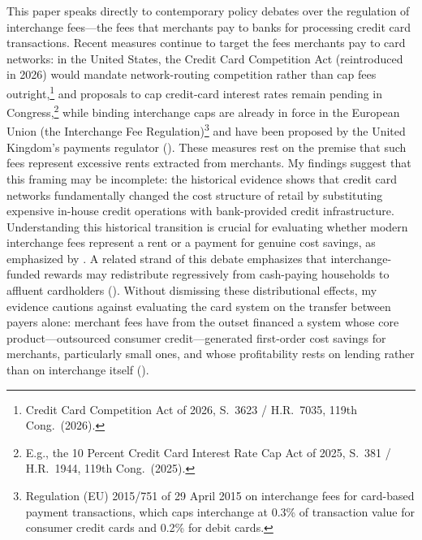 \documentclass[12pt,english]{article}
\begin{document}
This paper speaks directly to contemporary policy debates over the regulation of interchange fees---the fees that merchants pay to banks for processing credit card transactions. Recent measures continue to target the fees merchants pay to card networks: in the United States, the Credit Card Competition Act (reintroduced in 2026) would mandate network-routing competition rather than cap fees outright,\footnote{Credit Card Competition Act of 2026, S.~3623 / H.R.~7035, 119th Cong.\ (2026).} and proposals to cap credit-card interest rates remain pending in Congress,\footnote{E.g., the 10 Percent Credit Card Interest Rate Cap Act of 2025, S.~381 / H.R.~1944, 119th Cong.\ (2025).} while binding interchange caps are already in force in the European Union (the Interchange Fee Regulation)\footnote{Regulation (EU) 2015/751 of 29 April 2015 on interchange fees for card-based payment transactions, which caps interchange at 0.3\% of transaction value for consumer credit cards and 0.2\% for debit cards.} and have been proposed by the United Kingdom's payments regulator (\cite{psr_crossborder_2024}). These measures rest on the premise that such fees represent excessive rents extracted from merchants. My findings suggest that this framing may be incomplete: the historical evidence shows that credit card networks fundamentally changed the cost structure of retail by substituting expensive in-house credit operations with bank-provided credit infrastructure. Understanding this historical transition is crucial for evaluating whether modern interchange fees represent a rent or a payment for genuine cost savings, as emphasized by \cite{wang_regulating_2023}. A related strand of this debate emphasizes that interchange-funded rewards may redistribute regressively from cash-paying households to affluent cardholders (\cite{schuh_who_2010}). Without dismissing these distributional effects, my evidence cautions against evaluating the card system on the transfer between payers alone: merchant fees have from the outset financed a system whose core product---outsourced consumer credit---generated first-order cost savings for merchants, particularly small ones, and whose profitability rests on lending rather than on interchange itself (\cite{adams_credit_2022}).
\end{document}
